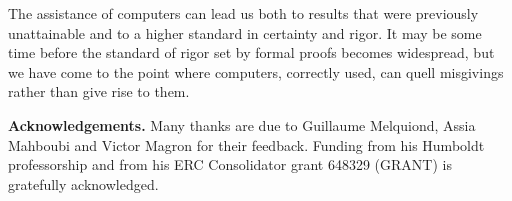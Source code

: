 The assistance of computers can lead us both to results that were previously
unattainable and to a higher standard in certainty and rigor.
It may be some time before the standard of rigor set by formal proofs
becomes widespread, but we have come to the point where computers, correctly
used, can quell misgivings rather than give rise to them. 


{\bf Acknowledgements.} Many thanks are due to Guillaume Melquiond, Assia Mahboubi and Victor Magron for their feedback. Funding from his Humboldt professorship and from his ERC Consolidator grant 648329 (GRANT) is gratefully acknowledged.
% 
% 
% 

